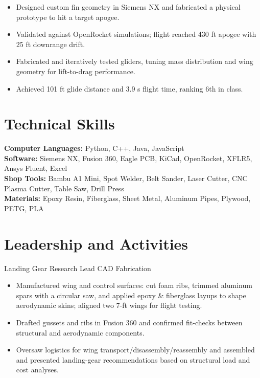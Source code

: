 \begin{itemize}
  \item Designed custom fin geometry in Siemens NX and fabricated a physical prototype to hit a target apogee.
  \item Validated against OpenRocket simulations; flight reached 430 ft apogee with 25 ft downrange drift.
\end{itemize}
\entrygap

\begin{itemize}
  \item Fabricated and iteratively tested gliders, tuning mass distribution and wing geometry for lift-to-drag performance.
  \item Achieved 101 ft glide distance and 3.9 s flight time, ranking 6th in class.
\end{itemize}

\section{Technical Skills}
\textbf{Computer Languages:} Python, C++, Java, JavaScript\\
\textbf{Software:} Siemens NX, Fusion 360, Eagle PCB, KiCad, OpenRocket, XFLR5, Ansys Fluent, Excel\\
\textbf{Shop Tools:} Bambu A1 Mini, Spot Welder, Belt Sander, Laser Cutter, CNC Plasma Cutter, Table Saw, Drill Press\\
\textbf{Materials:} Epoxy Resin, Fiberglass, Sheet Metal, Aluminum Pipes, Plywood, PETG, PLA

\section{Leadership and Activities}

Landing Gear Research Lead \textbar{} CAD \textbar{} Fabrication
\begin{itemize}
  \item Manufactured wing and control surfaces: cut foam ribs, trimmed aluminum spars with a circular saw, and applied epoxy \& fiberglass layups to shape aerodynamic skins; aligned two 7-ft wings for flight testing.
  \item Drafted gussets and ribs in Fusion 360 and confirmed fit-checks between structural and aerodynamic components.
  \item Oversaw logistics for wing transport/disassembly/reassembly and assembled and presented landing-gear recommendations based on structural load and cost analyses.
\end{itemize}
\entrygap

